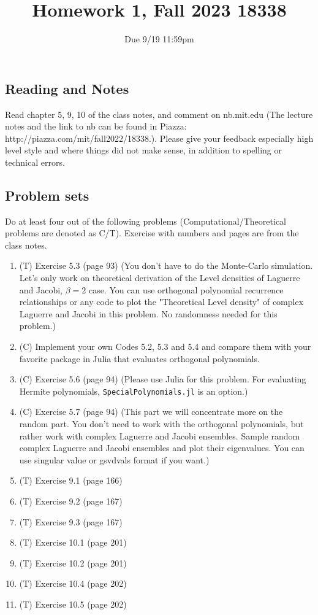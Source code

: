 \documentclass{article}
\title{Homework 1, Fall 2023 18338}
\author{Due 9/19 11:59pm}
\date{}
\begin{document}
\maketitle


\subsection*{Reading and Notes}

Read chapter 5, 9, 10 of the class notes, and comment on nb.mit.edu (The lecture notes and the link to nb can be found in Piazza: http://piazza.com/mit/fall2022/18338.). Please give your feedback especially high level style and where things did not make sense, in addition to spelling or technical errors.

\subsection*{Problem sets}
Do at least four out of the following problems (Computational/Theoretical problems are denoted as C/T). Exercise with numbers and pages are from the class notes.

\begin{enumerate}
    \item (T) Exercise 5.3 (page 93) (You don't have to do the Monte-Carlo simulation. Let's only work on theoretical derivation of the Level densities of Laguerre and Jacobi, $\beta=2$ case. You can use orthogonal polynomial recurrence relationships or any code to plot the "Theoretical Level density" of complex Laguerre and Jacobi in this problem. No randomness needed for this problem.)
    \item (C) Implement your own Codes 5.2, 5.3 and 5.4 and compare them with your favorite package in Julia that evaluates orthogonal polynomials.  
    \item (C) Exercise 5.6 (page 94) (Please use Julia for this problem. For evaluating Hermite polynomials, \verb|SpecialPolynomials.jl| is an option.)
    \item (C) Exercise 5.7 (page 94) (This part we will concentrate more on the random part. You don't need to work with the orthogonal polynomials, but rather work with complex Laguerre and Jacobi ensembles. Sample random complex Laguerre and Jacobi ensembles and plot their eigenvalues. You can use singular value or gsvdvals format if you want.)
    \item (T) Exercise 9.1 (page 166)
    \item (T) Exercise 9.2 (page 167)
    \item (T) Exercise 9.3 (page 167)
    \item (T) Exercise 10.1 (page 201)
    \item (T) Exercise 10.2 (page 201)
    \item (T) Exercise 10.4 (page 202)
    \item (T) Exercise 10.5 (page 202)
\end{enumerate}
 
\end{document}
